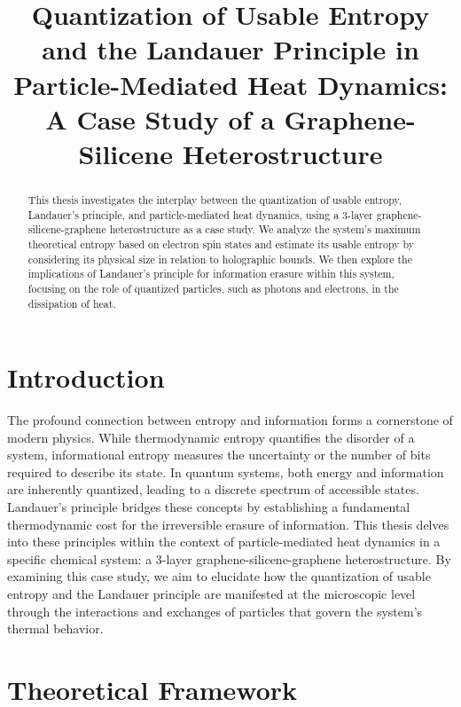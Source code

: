 \documentclass{article}
\begin{document}
	
	\title{Quantization of Usable Entropy and the Landauer Principle in Particle-Mediated Heat Dynamics: A Case Study of a Graphene-Silicene Heterostructure}
	\author{}
	\date{}
	\maketitle
	
	\begin{abstract}
		This thesis investigates the interplay between the quantization of usable entropy, Landauer's principle, and particle-mediated heat dynamics, using a 3-layer graphene-silicene-graphene heterostructure as a case study. We analyze the system's maximum theoretical entropy based on electron spin states and estimate its usable entropy by considering its physical size in relation to holographic bounds. We then explore the implications of Landauer's principle for information erasure within this system, focusing on the role of quantized particles, such as photons and electrons, in the dissipation of heat.
	\end{abstract}
	
	\section{Introduction}
	The profound connection between entropy and information forms a cornerstone of modern physics. While thermodynamic entropy quantifies the disorder of a system, informational entropy measures the uncertainty or the number of bits required to describe its state. In quantum systems, both energy and information are inherently quantized, leading to a discrete spectrum of accessible states. Landauer's principle bridges these concepts by establishing a fundamental thermodynamic cost for the irreversible erasure of information. This thesis delves into these principles within the context of particle-mediated heat dynamics in a specific chemical system: a 3-layer graphene-silicene-graphene heterostructure. By examining this case study, we aim to elucidate how the quantization of usable entropy and the Landauer principle are manifested at the microscopic level through the interactions and exchanges of particles that govern the system's thermal behavior.
	
	\section{Theoretical Framework}
	
\end{document}
